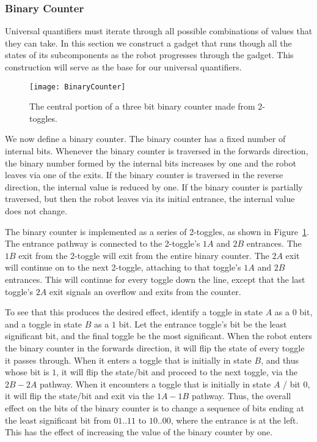 \subsubsection{Binary Counter}

Universal quantifiers must iterate through all possible combinations of values that they can take. In this section we construct a gadget that runs though all the states of its subcomponents as the robot progresses through the gadget. This construction will serve as the base for our universal quantifiers.

\begin{figure}[h!]
\centering
    \texttt{[image: BinaryCounter]}
    \caption{The central portion of a three bit binary counter made from 2-toggles.}
    \label{fig:BinaryCounter}
\end{figure}
  
We now define a binary counter. The binary counter has a fixed number of internal bits.
Whenever the binary counter is traversed in the forwards direction, the binary number
formed by the internal bits increases by one and the robot leaves via one of the exits.
If the binary counter is traversed in the reverse direction, the internal value is reduced by
one. If the binary counter is partially traversed, but then the robot leaves via its initial entrance,
the internal value does not change.

The binary counter is implemented as a series of 2-toggles, as shown in Figure~\ref{fig:BinaryCounter}.
The entrance pathway is connected to the 2-toggle's $1A$ and $2B$ entrances. The $1B$ exit from the 2-toggle
will exit from the entire binary counter. The $2A$ exit will continue on to the next 2-toggle,
attaching to that toggle's $1A$ and $2B$ entrances. This will continue for every toggle down the line, except
that the last toggle's $2A$ exit signals an overflow and exits from the counter.

To see that this produces the desired effect, identify a toggle in state $A$ as a $0$ bit, and a toggle in state
$B$ as a $1$ bit. Let the entrance toggle's bit be the least significant bit, and the final toggle be the
most significant. When the robot enters the binary counter in the forwards direction, it will flip
the state of every toggle it passes through. When it enters a toggle that is initially in state $B$, and thus whose
bit is $1$, it will flip the state/bit and proceed to the next toggle, via the $2B - 2A$ pathway. When it
encounters a toggle that is initially in state $A$ / bit $0$, it will flip the state/bit and exit via the $1A - 1B$
pathway. Thus, the overall effect on the bits of the binary counter is to change a sequence of bits ending at the
least significant bit from $01..11$ to $10..00$, where the entrance is at the left.
This has the effect of increasing the value of the binary counter by one.

